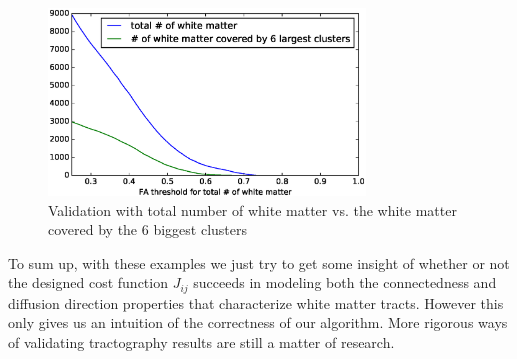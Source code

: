 \documentclass{article} %
\begin{document}
\begin{figure}[H]
  \begin{center}
\includegraphics[width=0.75\textwidth,height=0.25\textheight]{img/validation.eps}
  \end{center}
  \caption{Validation with total number of white matter vs. the white matter covered by the 6 biggest clusters}
  \label{fig:validation}
\end{figure}

To sum up, with these examples we just try to get some insight of whether or not the designed cost function $J_{ij}$ succeeds in modeling both the connectedness and diffusion direction properties that characterize white matter tracts. However this only gives us an intuition of the correctness of our algorithm. More rigorous ways of validating tractography results are still a matter of research.




\small{

 


}
\end{document}
